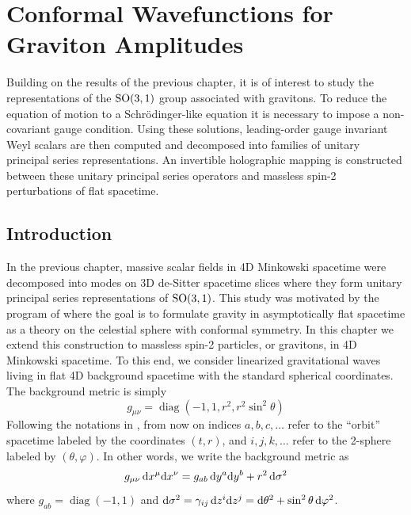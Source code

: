 \documentclass{brownthesis}
\DeclareMathOperator*{\diag}{diag}
\def\dd{{\rm d}}
\begin{document}
\chapter{Conformal Wavefunctions for Graviton Amplitudes}\label{chap:gravitons}
Building on the results of the previous chapter, it is of interest to study the
representations of the $\rm SO(3,1)$ group associated with gravitons. To reduce the equation of
motion to a Schr\"odinger-like equation it is necessary to impose a
non-covariant gauge condition. Using these solutions, leading-order
gauge invariant Weyl scalars are then computed and decomposed into
families of unitary principal series representations. An invertible
holographic mapping is constructed between these unitary principal
series operators and massless spin-2 perturbations of flat spacetime.

\section{Introduction}

In the previous chapter, massive scalar fields in 4D
Minkowski spacetime were decomposed into modes on 3D de-Sitter spacetime
slices where they form unitary principal series representations of
${\rm SO(3,1)}$. This study was motivated by the program of \cite{Pasterski:2016qvg}
where the goal is to formulate gravity in asymptotically flat spacetime
as a theory on the celestial sphere with conformal symmetry. In this
chapter we extend this construction to massless spin-2 particles, or
gravitons, in 4D Minkowski spacetime. To this end, we consider linearized
gravitational waves living in flat 4D background spacetime with the
standard spherical coordinates. The background metric is simply
\[
g_{\mu\nu}=\diag(-1,1,r^{2},r^{2}\sin^{2}\theta)
\]
Following the notations in \cite{Bernar:2014lna}, from now on indices
$a,b,c,\ldots$ refer to the ``orbit'' spacetime labeled by the
coordinates $(t,r)$, and $i,j,k,\ldots$ refer to the 2-sphere labeled
by $(\theta,\varphi)$. In other words, we write the background metric
as
\[
g_{\mu\nu}\,\dd x^{\mu}\dd x^{\nu}=g_{ab}\,\dd y^{a}\dd y^{b}+r^{2}\,\dd\sigma^{2}
\]
where $g_{ab}=\diag(-1,1)$ and $\dd\sigma^{2}=\gamma_{ij}\,\dd z^{i}\dd z^{j}=\dd\theta^{2}+\sin^{2}\theta\,\dd\varphi^{2}$.
\end{document}
